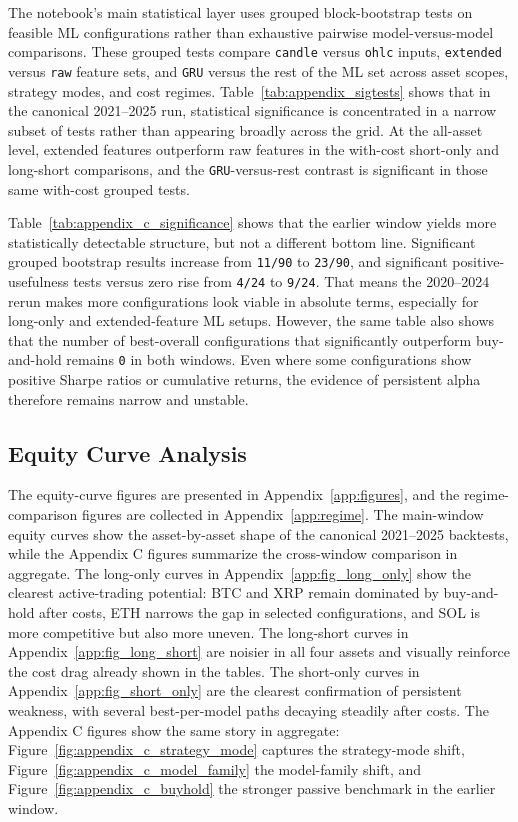 \documentclass[12pt]{article}
\begin{document}
The notebook’s main statistical layer uses grouped block-bootstrap tests on feasible ML configurations rather than exhaustive pairwise model-versus-model comparisons. These grouped tests compare \texttt{candle} versus \texttt{ohlc} inputs, \texttt{extended} versus \texttt{raw} feature sets, and \texttt{GRU} versus the rest of the ML set across asset scopes, strategy modes, and cost regimes. Table~\ref{tab:appendix_sigtests} shows that in the canonical 2021--2025 run, statistical significance is concentrated in a narrow subset of tests rather than appearing broadly across the grid. At the all-asset level, extended features outperform raw features in the with-cost short-only and long-short comparisons, and the \texttt{GRU}-versus-rest contrast is significant in those same with-cost grouped tests.

Table~\ref{tab:appendix_c_significance} shows that the earlier window yields more statistically detectable structure, but not a different bottom line. Significant grouped bootstrap results increase from \texttt{11/90} to \texttt{23/90}, and significant positive-usefulness tests versus zero rise from \texttt{4/24} to \texttt{9/24}. That means the 2020--2024 rerun makes more configurations look viable in absolute terms, especially for long-only and extended-feature ML setups. However, the same table also shows that the number of best-overall configurations that significantly outperform buy-and-hold remains \texttt{0} in both windows. Even where some configurations show positive Sharpe ratios or cumulative returns, the evidence of persistent alpha therefore remains narrow and unstable.

\subsection{Equity Curve Analysis}

The equity-curve figures are presented in Appendix~\ref{app:figures}, and the regime-comparison figures are collected in Appendix~\ref{app:regime}. The main-window equity curves show the asset-by-asset shape of the canonical 2021--2025 backtests, while the Appendix C figures summarize the cross-window comparison in aggregate.
The long-only curves in Appendix~\ref{app:fig_long_only} show the clearest active-trading potential: BTC and XRP remain dominated by buy-and-hold after costs, ETH narrows the gap in selected configurations, and SOL is more competitive but also more uneven. The long-short curves in Appendix~\ref{app:fig_long_short} are noisier in all four assets and visually reinforce the cost drag already shown in the tables. The short-only curves in Appendix~\ref{app:fig_short_only} are the clearest confirmation of persistent weakness, with several best-per-model paths decaying steadily after costs. The Appendix C figures show the same story in aggregate: Figure~\ref{fig:appendix_c_strategy_mode} captures the strategy-mode shift, Figure~\ref{fig:appendix_c_model_family} the model-family shift, and Figure~\ref{fig:appendix_c_buyhold} the stronger passive benchmark in the earlier window.
\end{document}
